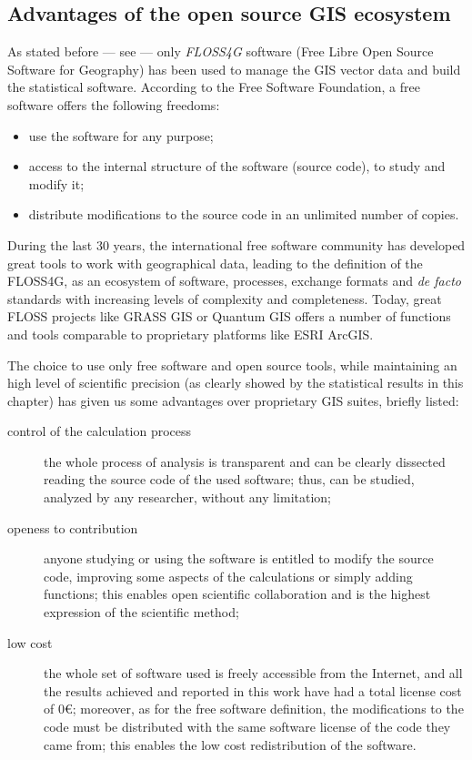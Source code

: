             \subsection{Advantages of the open source GIS ecosystem}
                As stated before --- see  --- only \emph{FLOSS4G} software (Free Libre Open Source Software for Geography) has been used to manage the GIS vector data and build the statistical software. According to the Free Software Foundation, %
                a free software offers the following freedoms:
                \begin{itemize}
                    \item use the software for any purpose;
                    \item access to the internal structure of the software (source code), to study and modify it;
                    \item distribute modifications to the source code in an unlimited number of copies.
                \end{itemize}
                During the last 30 years, the international free software community has developed great tools to work with geographical data, leading to the definition of the FLOSS4G, as an ecosystem of software, processes, exchange formats and \emph{de facto} standards with increasing levels of complexity and completeness. Today, great FLOSS projects like GRASS GIS or Quantum GIS offers a number of functions and tools comparable to proprietary platforms like ESRI ArcGIS.

                The choice to use only free software and open source tools, while maintaining an high level of scientific precision (as clearly showed by the statistical results in this chapter) has given us some advantages over proprietary GIS suites, briefly listed:
                \begin{description}
                    \item[control of the calculation process] the whole process of analysis is transparent and can be clearly dissected reading the source code of the used software; thus, can be studied, analyzed by any researcher, without any limitation;
                    \item[openess to contribution] anyone studying or using the software is entitled to modify the source code, improving some aspects of the calculations or simply adding functions; this enables open scientific collaboration and is the highest expression of the scientific method;
                    \item[low cost] the whole set of software used is freely accessible from the Internet, and all the results achieved and reported in this work have had a total license cost of $0\euro$; moreover, as for the free software definition, the modifications to the code must be distributed with the same software license of the code they came from; this enables the low cost redistribution of the software.
                \end{description}
